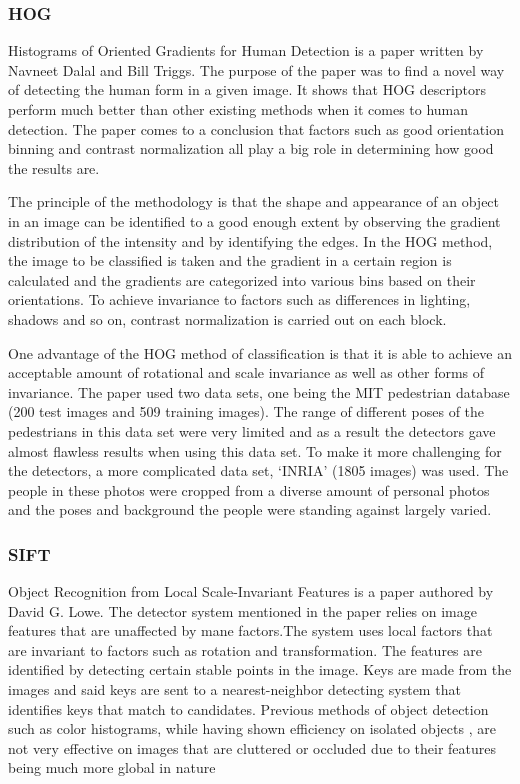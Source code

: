 \documentclass[]{IEEEphot}
\begin{document}
\subsubsection{HOG}

Histograms of Oriented Gradients for Human Detection is a paper written by Navneet Dalal and Bill Triggs. The purpose of the paper was to find a novel way of detecting the human form in a given image. It shows that HOG descriptors perform much better than other existing methods when it comes to human detection. The paper comes to a conclusion that factors such as good orientation binning and contrast normalization all play a big role in determining how good the results are.

The principle of the methodology is that the shape and appearance of an object in an image can be identified to a good enough extent by observing the gradient distribution of the intensity and by identifying the edges. In the HOG method, the image to be classified is taken and the gradient in a certain region is calculated and the gradients are categorized into various bins based on their orientations. To achieve invariance to factors such as differences in lighting, shadows and so on, contrast normalization is carried out on each block. 

One advantage of the HOG method of classification is that it is able to achieve an acceptable amount of rotational and scale invariance as well as other forms of invariance. 
The paper used two data sets, one being the MIT pedestrian database (200 test images and 509 training images). The range of different poses of the pedestrians in this data set were very limited and as a result the detectors gave almost flawless results when using this data set. To make it more challenging for the detectors, a more complicated data set, ‘INRIA’ (1805 images) was used. The people in these photos were cropped from a diverse amount of personal photos and the poses and background the people were standing against largely varied. 


\subsubsection{SIFT}

Object Recognition from Local Scale-Invariant Features is a paper authored by David G. Lowe. The detector system mentioned in the paper relies on image features that are unaffected by mane factors.The system uses local factors that are invariant to factors such as rotation and transformation. The features are identified by detecting certain stable points in the image.  Keys are made from the images and said keys are sent to a nearest-neighbor detecting system that identifies keys that match to candidates. 
Previous methods of object detection such as color histograms, while having shown efficiency on isolated objects , are not very effective on images that are cluttered or occluded due to their features being much more global in nature 
\end{document}
